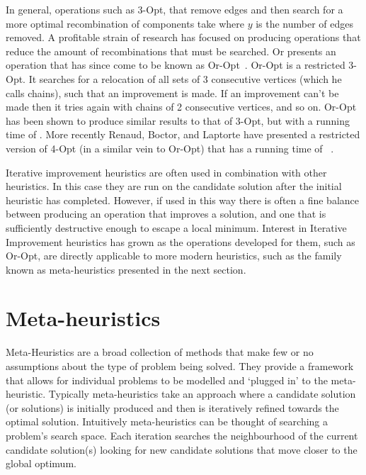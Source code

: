 In general, operations such as 3-Opt, that remove edges and then search for a more optimal recombination of components take  where $y$ is the number of edges removed. A profitable strain of research has focused on producing operations that reduce the amount of recombinations that must be searched. Or presents an operation that has since come to be known as Or-Opt~\cite{Or:1976}. Or-Opt is a restricted 3-Opt. It searches for a relocation of all sets of 3 consecutive vertices (which he calls chains), such that an improvement is made. If an improvement can't be made then it tries again with chains of 2 consecutive vertices, and so on. Or-Opt has been shown to produce similar results to that of 3-Opt, but with a running time of . More recently Renaud, Boctor, and Laptorte have presented a restricted version of 4-Opt (in a similar vein to Or-Opt) that has a running time of ~\cite{RBL:1996}. 

Iterative improvement heuristics are often used in combination with other heuristics. In this case they are run on the candidate solution after the initial heuristic has completed. However, if used in this way there is often a fine balance between producing an operation that improves a solution, and one that is sufficiently destructive enough to escape a local minimum. Interest in Iterative Improvement heuristics has grown as the operations developed for them, such as Or-Opt, are directly applicable to more modern heuristics, such as the family known as meta-heuristics presented in the next section. 

\section{Meta-heuristics}
\label{sec:mh}

Meta-Heuristics are a broad collection of methods that make few or no assumptions about the type of problem being solved. They provide a framework that allows for individual problems to be modelled and `plugged in' to the meta-heuristic. Typically meta-heuristics take an approach where a candidate solution (or solutions) is initially produced and then is iteratively refined towards the optimal solution. Intuitively meta-heuristics can be thought of searching a problem's search space. Each iteration searches the neighbourhood of the current candidate solution(s) looking for new candidate solutions that move closer to the global optimum.

